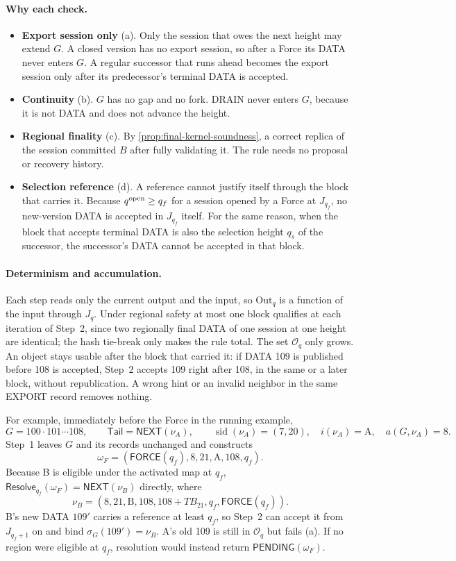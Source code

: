\documentclass[11pt,a4paper]{article}
\newcommand{\TB}{\mathit{TB}}
\newcommand{\tagg}[1]{\ensuremath{\mathsf{#1}}}
\begin{document}
\paragraph{Why each check.}
\begin{itemize}[itemsep=2pt]
\item \textbf{Export session only} (a). Only the session that owes the
next height may extend $G$. A closed version has no export session, so
after a Force its DATA never enters $G$. A regular successor that runs
ahead becomes the export session only after its predecessor's terminal
DATA is accepted.
\item \textbf{Continuity} (b). $G$ has no gap and no fork. DRAIN never
enters $G$, because it is not DATA and does not advance the height.
\item \textbf{Regional finality} (c). By
\cref{prop:final-kernel-soundness}, a correct replica of the session
committed $B$ after fully validating it. The rule needs no proposal or
recovery history.
\item \textbf{Selection reference} (d). A reference cannot justify itself
through the block that carries it. Because $q^{\rm open}\ge q_f$ for a
session opened by a Force at $J_{q_f}$, no new-version DATA is accepted
in $J_{q_f}$ itself. For the same reason, when the block that accepts
terminal DATA is also the selection height $q_s$ of the successor, the
successor's DATA cannot be accepted in that block.
\end{itemize}

\paragraph{Determinism and accumulation.}
Each step reads only the current output and the input, so
$\mathrm{Out}_q$ is a function of the input through $J_q$. Under regional
safety at most one block qualifies at each iteration of Step~2, since two regionally final
DATA of one session at one height are identical; the hash tie-break only
makes the rule total. The set $\mathcal O_q$ only grows. An object stays
usable after the block that carried it: if DATA 109 is published before
108 is accepted, Step~2 accepts 109 right after 108, in the same or a
later block, without republication. A wrong hint or an invalid neighbor
in the same EXPORT record removes nothing.

For example, immediately before the Force in the running example,
\[
 G=100\cdot101\cdots108,\qquad
 \mathsf{Tail}=\tagg{NEXT}(\nu_A),\qquad
 \operatorname{sid}(\nu_A)=(7,20),\quad i(\nu_A)=\text{A},\quad
 a(G,\nu_A)=8.
\]
Step~1 leaves $G$ and its records unchanged and constructs
\[
 \omega_F=(\tagg{FORCE}(q_f),8,21,\text{A},108,q_f).
\]
Because B is eligible under the activated map at $q_f$,
$\tagg{Resolve}_{q_f}(\omega_F)=\tagg{NEXT}(\nu_B)$ directly, where
\[
 \nu_B=(8,21,\text{B},108,108+\TB_{21},q_f,
        \tagg{FORCE}(q_f)).
\]
B's new DATA $109'$ carries a reference at least $q_f$, so Step~2 can
accept it from $J_{q_f+1}$ on and bind
$\sigma_G(109')=\nu_B$. A's old 109 is still in $\mathcal O_q$ but
fails (a). If no region were eligible at $q_f$, resolution would instead
return $\tagg{PENDING}(\omega_F)$.
\end{document}

